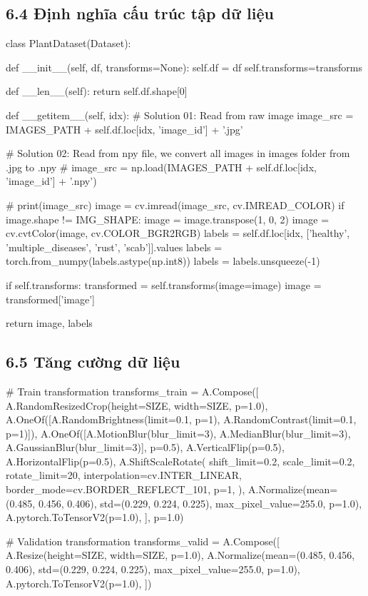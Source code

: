 \documentclass{article}
\begin{document}
	\subsection{6.4 Định nghĩa cấu trúc tập dữ liệu}
	\begin{python}
		class PlantDataset(Dataset):
		
			def __init__(self, df, transforms=None):
				self.df = df
				self.transforms=transforms
		
			def __len__(self):
				return self.df.shape[0]
		
			def __getitem__(self, idx):
				# Solution 01: Read from raw image
				image_src = IMAGES_PATH + self.df.loc[idx, 'image_id'] + '.jpg'
		
				# Solution 02: Read from npy file, we convert all images in images folder from .jpg to .npy
				# image_src = np.load(IMAGES_PATH + self.df.loc[idx, 'image_id'] + '.npy')
		
				# print(image_src)
				image = cv.imread(image_src, cv.IMREAD_COLOR)
				if image.shape != IMG_SHAPE:
					image = image.transpose(1, 0, 2)
				image = cv.cvtColor(image, cv.COLOR_BGR2RGB)
				labels = self.df.loc[idx, ['healthy', 'multiple_diseases', 'rust', 'scab']].values
				labels = torch.from_numpy(labels.astype(np.int8))
				labels = labels.unsqueeze(-1)
		
				if self.transforms:
					transformed = self.transforms(image=image)
				image = transformed['image']
		
				return image, labels
	\end{python}
	\subsection{6.5 Tăng cường dữ liệu}
	\begin{python}
		# Train transformation
		transforms_train = A.Compose([
			A.RandomResizedCrop(height=SIZE, width=SIZE, p=1.0),
			A.OneOf([A.RandomBrightness(limit=0.1, p=1), A.RandomContrast(limit=0.1, p=1)]),
			A.OneOf([A.MotionBlur(blur_limit=3), A.MedianBlur(blur_limit=3), A.GaussianBlur(blur_limit=3)], p=0.5),
			A.VerticalFlip(p=0.5),
			A.HorizontalFlip(p=0.5),
			A.ShiftScaleRotate(
			shift_limit=0.2,
			scale_limit=0.2,
			rotate_limit=20,
			interpolation=cv.INTER_LINEAR,
			border_mode=cv.BORDER_REFLECT_101,
			p=1,
		),
			A.Normalize(mean=(0.485, 0.456, 0.406), std=(0.229, 0.224, 0.225), max_pixel_value=255.0, p=1.0),
			A.pytorch.ToTensorV2(p=1.0),
		], p=1.0)
		
		# Validation transformation
		transforms_valid = A.Compose([
			A.Resize(height=SIZE, width=SIZE, p=1.0),
			A.Normalize(mean=(0.485, 0.456, 0.406), std=(0.229, 0.224, 0.225), max_pixel_value=255.0, p=1.0),
			A.pytorch.ToTensorV2(p=1.0),
		])
	\end{python}
\end{document}

